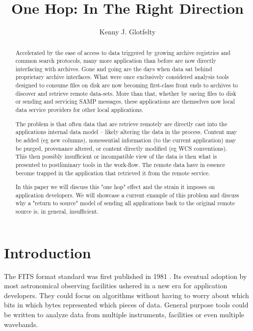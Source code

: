 
\resetcounters





\title{One Hop: In The Right Direction} \author{Kenny J. Glotfelty}

\begin{abstract}

Accelerated by the ease of access to data triggered by growing archive
registries and common search protocols, many more application than
before are now directly interfacing with archives.  Gone and going are
the days when data sat behind proprietary archive interfaces.  What were
once exclusively considered analysis tools designed to consume files
on disk are now becoming first-class front ends to archives to discover
and retrieve remote data-sets.  More than that, whether by saving files
to disk or sending and servicing SAMP messages, these applications are
themselves now local data service providers for other local applications.

The problem is that often data that are retrieve remotely are directly
cast into the applications internal data model -- likely altering
the data in the process.  Content may be added (eg new columns),
nonessential information (to the current application) may be purged,
provenance altered, or content directly modified (eg WCS conventions).
This then possibly insufficient or incompatible view of the  data is then
what is presented to postliminary tools in the work-flow. The remote
data have in essence become trapped in the application that retrieved
it from the remote service.

In this paper we will discuss this "one hop" effect and the strain
it imposes on application developers.  We will showcase a current
example of this problem and discuss why a "return to source" model
of sending all applications back to the original remote source is,
in general, insufficient.


\end{abstract}

\section{Introduction}


The FITS format standard was first published in 
1981 \citep{1981A&AS...44..363W}.  Its eventual
adoption by most astronomical observing facilities ushered in a new era for
application developers.  They could focus on algorithms without having to
worry about which bits in which bytes represented which pieces of data.
General purpose tools could be written to analyze data from multiple
instruments, facilities or even multiple wavebands.

